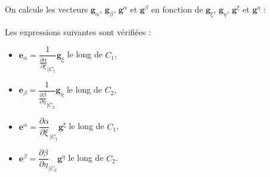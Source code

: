 On calcule les vecteurs $\mathbf{g}_{\alpha}$, $\mathbf{g}_{\beta}$, $\mathbf{g}^{\alpha}$ et $\mathbf{g}^{\beta}$ en fonction de $\mathbf{g}_{\xi}$, $\mathbf{g}_{\eta}$, $\mathbf{g}^{\xi}$ et $\mathbf{g}^{\eta}$ :

\begin{proposition}
Les expressions suivantes sont vérifiées :
\begin{itemize}
\item $\mathbf{e}_{\alpha} = \dfrac{1}{\frac{\partial \alpha}{\partial \xi}_{|C_1}} \mathbf{g}_{\xi}$ le long de $C_1$,
\item $\mathbf{e}_{\beta} = \dfrac{1}{\frac{\partial \beta}{\partial \eta}_{|C_2}} \mathbf{g}_{\eta}$ le long de $C_2$,
\item $\mathbf{e}^{\alpha} = \dfrac{\partial \alpha}{\partial \xi}_{|C_1} \mathbf{g}^{\xi}$ le long de $C_1$,
\item $\mathbf{e}^{\beta} = \dfrac{\partial \beta}{\partial \eta}_{|C_2} \mathbf{g}^{\eta}$ le long de $C_2$.
\end{itemize}
\label{prop: g_alpha g_beta fct de g_xi g_eta}
\end{proposition}

